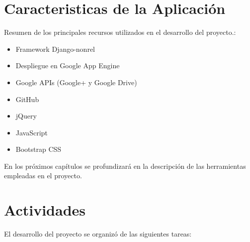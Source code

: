 \section{Caracteristicas de la Aplicación}
\label{1:sec:2}
Resumen de los principales recursos utilizados en el desarrollo del proyecto.:
\begin{itemize}
  \item Framework Django-nonrel
  \item Despliegue en Google App Engine
  \item Google APIs (Google+ y Google Drive)
  \item GitHub
  \item jQuery
  \item JavaScript
  \item Bootstrap CSS
  
\end{itemize}
En los próximos capítulos se profundizará en la descripción de las herramientas empleadas en el proyecto.

\section{Actividades}
\label{1:sec:3}
El desarrollo del proyecto se organizó de las siguientes tareas:


